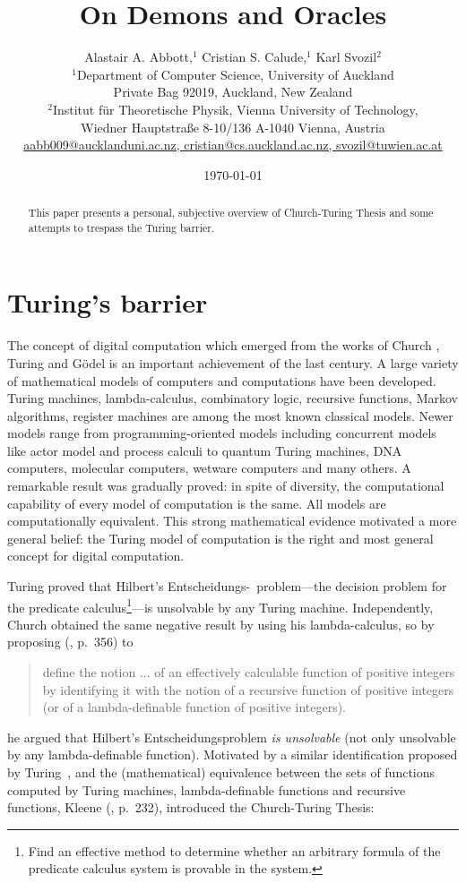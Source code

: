 \documentclass[10pt]{article}
\title{On Demons and Oracles}
\author{Alastair A. Abbott,$^{1}$  Cristian S. Calude,$^{1}$ Karl Svozil$^{2}$\\
$^{1}$Department of Computer Science,
University of Auckland\\
Private Bag 92019, Auckland, New Zealand\\
$^{2}$Institut f\"ur Theoretische Physik, Vienna University of Technology,  \\
Wiedner Hauptstra\ss e 8-10/136 A-1040 Vienna, Austria\\
\url{aabb009@aucklanduni.ac.nz, cristian@cs.auckland.ac.nz, svozil@tuwien.ac.at}}
\begin{document}
\maketitle
 \date{\today}
\begin{abstract}
This paper presents a personal, subjective overview of Church-Turing Thesis and some attempts to trespass the Turing barrier.
\end{abstract}




\section{Turing's barrier}
The concept of digital computation which emerged  from the works of Church ,
Turing  and G\"odel  is an important achievement of  the last century.
A large variety  of mathematical models  of computers and computations have been developed.
 Turing machines,
lambda-calculus,
combinatory logic, recursive functions,
Markov algorithms,
register machines
are among the most known classical
models. Newer models range from  programming-oriented models including concurrent models like actor model and process calculi to
quantum Turing machines, DNA computers, molecular computers, wetware computers and many others. A remarkable result
was gradually proved: in spite of  diversity, the computational capability of every model of computation is the same. All models are
computationally equivalent. This strong mathematical evidence motivated a more general belief: the Turing model of computation
is the right and most general concept for digital computation.

Turing  proved that Hilbert's Entscheidungs-\ problem---the decision problem for the predicate
calculus\footnote{Find an effective method to determine whether an arbitrary formula
of the predicate calculus system is provable in the system.}---is unsolvable by any Turing machine. Independently,
Church  obtained the same negative result by using his lambda-calculus, so by proposing (\cite{church30}, p.\ 356) to

\begin{quote}
define the notion ... of an effectively calculable function of positive integers by identifying it with the notion of a recursive function of positive integers (or of a lambda-definable function of positive integers).
\end{quote}
he argued that Hilbert's Entscheidungsproblem {\em is unsolvable} (not only unsolvable by any lambda-definable function). Motivated by a similar  identification  proposed by Turing~\cite{turing-36}, and the (mathematical) equivalence between the
sets of functions computed by Turing machines,  lambda-definable functions and recursive functions,  Kleene (\cite{kleene-52}, p.\ 232),
introduced the
Church-Turing Thesis:
\end{document}
